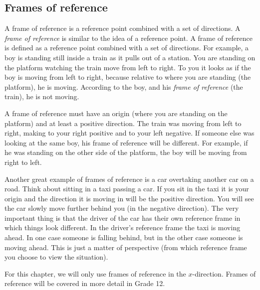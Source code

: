            \subsection*{Frames of reference}
            \nopagebreak
\par
{} { A frame of reference is a reference point combined with a set of directions. } 
        \label{m38787*id62648}A \textsl{frame of reference} is similar to the idea of a reference point. A frame of reference is defined as a reference point combined with a set of directions. For example, a boy is standing still inside a train as it pulls out of a station. You are standing on the platform watching the train move from left to right. To you it looks as if the boy is moving from left to right, because relative to where you are standing (the platform), he is moving. According to the boy, and his \textsl{frame of reference} (the train), he is not moving.\par 
        \label{m38787*id62666}A frame of reference must have an origin (where you are standing on the platform) and at least a positive direction. The train was moving from left to right, making to your right positive and to your left negative. If someone else was looking at the same boy, his frame of reference will be different. For example, if he was standing on the other side of the platform, the boy will be moving from right to left.\par 
        \label{m38787*eip-271}Another great example of frames of reference is a car overtaking another car on a road. Think about sitting in a taxi passing a car. If you sit in the taxi it is your origin and the direction it is moving in will be the positive direction. You will see the car slowly move further behind you (in the negative direction). The very important thing is that the driver of the car has their own reference frame in which things look different. In the driver's reference frame the taxi is moving ahead. In one case someone is falling behind, but in the other case someone is moving ahead. This is just a matter of perspective (from which reference frame you choose to view the situation).\par \label{m38787*id62675}For this chapter, we will only use frames of reference in the $x$-direction.
Frames of reference will be covered in more detail in Grade 12.\par 
    \setcounter{subfigure}{0}
